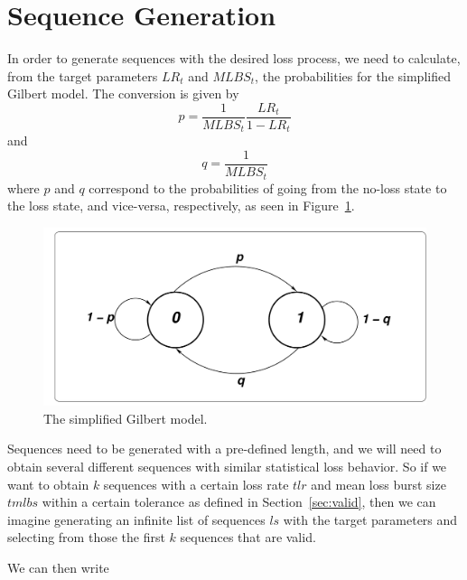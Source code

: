 \documentclass{article}
\begin{document}
\section{Sequence Generation}

In order to generate sequences with the desired loss process, we need to
calculate, from the target parameters $LR_t$ and $MLBS_t$, the probabilities for
the simplified Gilbert model. The conversion is given by
$$
 p = \frac{1}{MLBS_t}\frac{LR_t}{1-LR_t}
$$
and 
$$
q = \frac{1}{MLBS_t}
$$
where $p$ and $q$ correspond to the probabilities of going from the no-loss
state to the loss state, and vice-versa, respectively, as seen in Figure~\ref{fig:gilbert}.  

\begin{figure}[h]
\centering
\includegraphics[scale=0.2]{figs/gilbert_simplified.pdf}
\caption{The simplified Gilbert model.}
\label{fig:gilbert}
\end{figure}


Sequences need to be generated with a pre-defined length, and we will need to
obtain several different sequences with similar statistical loss behavior. So if
we want to obtain $k$ sequences with a certain loss rate $tlr$ and mean loss
burst size $tmlbs$ within a certain tolerance as defined in
Section~\ref{sec:valid}, then we can imagine generating an infinite list of
sequences $ls$ with the target parameters and selecting from those the first $k$
sequences that are valid.

We can then write
\end{document}
